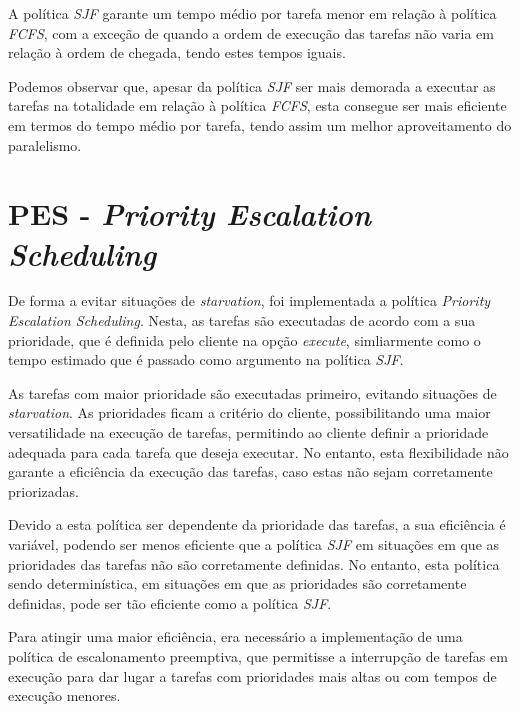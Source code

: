 \documentclass[a4paper,11pt]{scrreprt}
\begin{document}
        A política \textit{SJF} garante um tempo médio por tarefa menor em relação à política \textit{FCFS},
        com a exceção de quando a ordem de execução das tarefas não varia em relação à ordem de chegada,
        tendo estes tempos iguais.

        Podemos observar que, apesar da política \textit{SJF} ser mais demorada a executar
        as tarefas na totalidade em relação à política \textit{FCFS}, esta consegue ser mais eficiente
        em termos do tempo médio por tarefa, tendo assim um melhor aproveitamento do paralelismo.

    \section{\textbf{PES} - \textit{Priority Escalation Scheduling}}
        De forma a evitar situações de \textit{starvation}, foi implementada a política
        \textit{Priority Escalation Scheduling}. Nesta, as tarefas são executadas
        de acordo com a sua prioridade, que é definida pelo cliente na opção \textit{execute},
        simliarmente como o tempo estimado que é passado como argumento na política \textit{SJF}.

        As tarefas com maior prioridade são executadas primeiro, evitando
        situações de \textit{starvation}. As prioridades ficam a critério do cliente,
        possibilitando uma maior versatilidade na execução de tarefas, permitindo ao cliente
        definir a prioridade adequada para cada tarefa que deseja executar. No entanto, esta
        flexibilidade não garante a eficiência da execução das tarefas, caso estas não sejam
        corretamente priorizadas.

        \clearpage
        Devido a esta política ser dependente da prioridade das tarefas, a sua eficiência
        é variável, podendo ser menos eficiente que a política \textit{SJF} em situações
        em que as prioridades das tarefas não são corretamente definidas. No entanto, esta
        política sendo determinística, em situações em que as prioridades são corretamente
        definidas, pode ser tão eficiente como a política \textit{SJF}.

        Para atingir uma maior eficiência, era necessário a implementação de uma política
        de escalonamento preemptiva, que permitisse a interrupção de tarefas em execução
        para dar lugar a tarefas com prioridades mais altas ou com tempos de execução
        menores.
\end{document}
